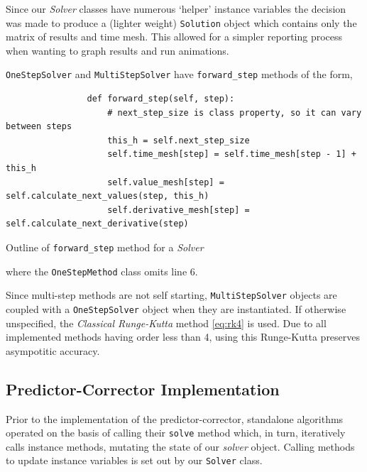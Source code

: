 \documentclass[12pt, twoside]{report}
\theoremstyle{plain}
\theoremstyle{definition}
\theoremstyle{definition}
\begin{document}
        Since our \textit{Solver} classes have numerous `helper' instance 
        variables the decision was made to produce a (lighter weight) 
        \texttt{Solution} object which contains only the matrix of
        results and time mesh. This allowed for a simpler reporting process
        when wanting to graph results and run animations.

        \texttt{OneStepSolver} and 
        \texttt{MultiStepSolver} have
        \texttt{forward_step} methods of the form,
        \begin{listing}[H]
            \begin{verbatim}
                def forward_step(self, step):
                    # next_step_size is class property, so it can vary between steps
                    this_h = self.next_step_size
                    self.time_mesh[step] = self.time_mesh[step - 1] + this_h
                    self.value_mesh[step] = self.calculate_next_values(step, this_h)
                    self.derivative_mesh[step] = self.calculate_next_derivative(step)
            \end{verbatim}
            \caption{Outline of \texttt{forward_step} method for 
                     a \textit{Solver}}
            \label{3_forward_step}
        \end{listing}
        \noindent where the \texttt{OneStepMethod} class omits 
        line 6.

        Since multi-step methods are not self starting,
        \texttt{MultiStepSolver} objects are coupled with a 
        \texttt{OneStepSolver} object when they are instantiated. 
        If otherwise unspecified, the \textit{Classical Runge-Kutta} method 
        \eqref{eq:rk4} is used. Due to all implemented methods having order less
        than 4, using this Runge-Kutta preserves asympotitic accuracy.



        \subsection{Predictor-Corrector Implementation}
            Prior to the implementation of the predictor-corrector, standalone 
            algorithms operated on the basis of calling their
            \texttt{solve} method which, in turn, iteratively calls
            instance methods, mutating the state of our \textit{solver} 
            object. Calling methods to update instance variables is set out by
            our \texttt{Solver} class.
\end{document}

